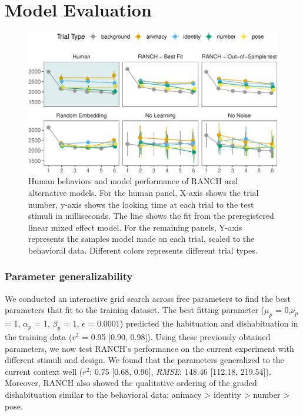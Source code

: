 \documentclass[10pt, letterpaper]{article}
\newenvironment{CodeChunk}{}{}
\begin{document}
\hypertarget{model-evaluation}{%
\section{Model Evaluation}\label{model-evaluation}}

\begin{CodeChunk}
\begin{figure}[h!]

{\centering \includegraphics{figs/lol-1} 

}

\caption[Human behaviors and model performance of RANCH and alternative models]{Human behaviors and model performance of RANCH and alternative models. For the human panel, X-axis shows the trial number, y-axis shows the looking time at each trial to the test stimuli in milliseconds. The line shows the fit from the preregistered linear mixed effect model. For the remaining panels, Y-axis represents the samples model made on each trial, scaled to the behavioral data. Different colors represents different trial types.}\label{fig:lol}
\end{figure}
\end{CodeChunk}

\hypertarget{parameter-generalizability}{%
\subsubsection{Parameter
generalizability}\label{parameter-generalizability}}

We conducted an interactive grid search across free parameters to find
the best parameters that fit to the training dataset. The best fitting
parameter (\(\mu_{p}\) = 0,\(\nu_{p}\) = 1, \(\alpha_{p}\) = 1,
\(\beta_{p}\) = 1, \(\epsilon\) = 0.0001) predicted the habituation and
dishabituation in the training data (\(r^2\) = 0.95 {[}0.90, 0.98{]}).
Using these previously obtained parameters, we now test RANCH's
performance on the current experiment with different stimuli and design.
We found that the parameters generalized to the current context well
(\(r^2\): 0.75 {[}0.68, 0.96{]}, \emph{RMSE}: 148.46 {[}112.18,
219.54{]}). Moreover, RANCH also showed the qualitative ordering of the
graded dishabituation similar to the behavioral data: animacy
\textgreater{} identity \textgreater{} number \textgreater{} pose.
\end{document}
